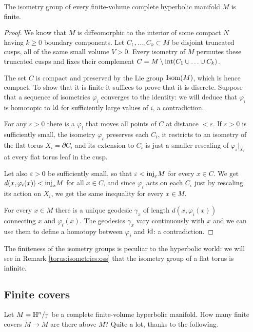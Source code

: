 \begin{cor} \label{finite:isometry:group:cor}
The isometry group of every finite-volume complete hyperbolic manifold $M$ is finite. 
\end{cor}
\begin{proof}
We know that $M$ is diffeomorphic to the interior of some compact $N$ having $k\geqslant 0$ boundary components. Let $C_1,\ldots, C_k \subset M$ be disjoint truncated cusps, all of the same small volume $V>0$. Every isometry of $M$ permutes these truncated cusps and fixes their complement $C = M\setminus {\rm int}(C_1\cup \ldots \cup C_k)$.

The set $C$ is compact and preserved by the Lie group ${\rm Isom}(M)$, which is hence compact. To show that it is finite it suffices to prove that it is discrete. Suppose that a sequence of isometries $\varphi_i$ converges to the identity: we will deduce that $\varphi_i$ is homotopic to ${\rm id}$ for sufficiently large values of $i$, a contradiction.

For any $\varepsilon>0$ there is a $\varphi_i$ that moves all points of $C$ at distance $<\varepsilon$. 
If $\varepsilon>0$ is sufficiently small, the isometry $\varphi_i$ preserves each $C_i$, 
it restricts to an isometry of the flat torus $X_i = \partial C_i$ and its extension to $C_i$ is just a smaller rescaling of $\varphi_i|_{X_i}$ at every flat torus leaf in the cusp. 

Let also $\varepsilon>0$ be sufficiently small, so that $\varepsilon <{\rm inj}_x M$ for every $x\in C$. We get $d(x,\varphi_i(x))<{\rm inj}_xM$ for all $x\in C$, and since $\varphi_i$ acts on each $C_i$ just by rescaling its action on $X_i$, we get the same inequality for every $x\in M$.

For every $x\in M$ there is a unique geodesic $\gamma_x$ of length $d(x,\varphi_i(x))$ connecting $x$ and $\varphi_i(x)$. The geodesics $\gamma_x$ vary continuously with $x$ and we can use them to define a homotopy between $\varphi_i$ and ${\rm id}$: a contradiction.
\end{proof}

The finiteness of the isometry groups is peculiar to the hyperbolic world: we will see in Remark \ref{torus:isometries:oss} that the isometry group of a flat torus is infinite.

\subsection{Finite covers} \label{finite:covers:subsection}
Let $M=\mathbb{H}^n/_\Gamma$ be a complete finite-volume hyperbolic manifold. How many finite covers $\tilde M \to M$ are there above $M$? Quite a lot, thanks to the following.

